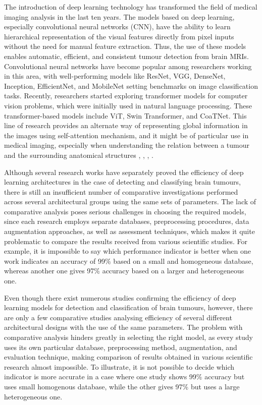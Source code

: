 \documentclass[final,3p,times,number]{elsarticle}
\begin{document}
The introduction of deep learning technology has transformed the field of medical imaging analysis in the last ten years. The models based on deep learning, especially convolutional neural networks (CNN), have the ability to learn hierarchical representation of the visual features directly from pixel inputs without the need for manual feature extraction. Thus, the use of these models enables automatic, efficient, and consistent tumour detection from brain MRIs. Convolutional neural networks have become popular among researchers working in this area, with well-performing models like ResNet, VGG, DenseNet, Inception, EfficientNet, and MobileNet setting benchmarks on image classification tasks. Recently, researchers started exploring transformer models for computer vision problems, which were initially used in natural language processing. These transformer-based models include ViT, Swin Transformer, and CoaTNet. This line of research provides an alternate way of representing global information in the images using self-attention mechanism, and it might be of particular use in medical imaging, especially when understanding the relation between a tumour and the surrounding anatomical structures \cite{ref28}, \cite{ref29}, \cite{ref30}, \cite{ref32}.

Although several research works have separately proved the efficiency of deep learning architectures in the case of detecting and classifying brain tumours, there is still an insufficient number of comparative investigations performed across several architectural groups using the same sets of parameters. The lack of comparative analysis poses serious challenges in choosing the required models, since each research employs separate databases, preprocessing procedures, data augmentation approaches, as well as assessment techniques, which makes it quite problematic to compare the results received from various scientific studies. For example, it is impossible to say which performance indicator is better when one work indicates an accuracy of 99\% based on a small and homogeneous database, whereas another one gives 97\% accuracy based on a larger and heterogeneous one.

Even though there exist numerous studies confirming the efficiency of deep learning models for detection and classification of brain tumours, however, there are only a few comparative studies analysing efficiency of several different architectural designs with the use of the same parameters. The problem with comparative analysis hinders greatly in selecting the right model, as every study uses its own particular database, preprocessing method, augmentation, and evaluation technique, making comparison of results obtained in various scientific research almost impossible. To illustrate, it is not possible to decide which indicator is more accurate in a case where one study shows 99\% accuracy but uses small homogenous database, while the other gives 97\% but uses a large heterogeneous one.
\end{document}
